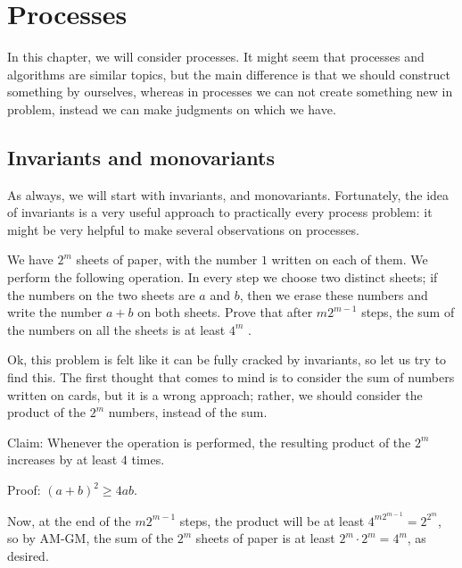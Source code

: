 \chapter{Processes}

In this chapter, we will consider processes. It might seem that processes and algorithms are similar topics, but the main difference is that we should construct something by ourselves, whereas in processes we can not create something new in problem, instead we can make judgments on which we have.

\section{Invariants and monovariants}

As always, we will start with invariants, and monovariants. Fortunately, the idea of invariants is a very useful approach to practically every process problem: it might be very helpful to make several observations on processes.

\begin{example}[ISL 2014]
    We have $2^m$ sheets of paper, with the number $1$ written on each of them. We perform the following operation. In every step we choose two distinct sheets; if the numbers on the two sheets are $a$ and $b$, then we erase these numbers and write the number $a + b$ on both sheets. Prove that after $m2^{m -1}$ steps, the sum of the numbers on all the sheets is at least $4^m$ .
\end{example}

\sol Ok, this problem is felt like it can be fully cracked by invariants, so let us try to find this. The first thought that comes to mind is to consider the sum of numbers written on cards, but it is a wrong approach; rather, we should consider the product of the $2^m$ numbers, instead of the sum.

Claim: Whenever the operation is performed, the resulting product of the $2^m$ increases by at least $4$ times.

Proof: $(a+b)^2 \geq 4ab$.

Now, at the end of the $m2^{m-1}$ steps, the product will be at least $4^{m2^{m-1}} = 2^{2^m}$, so by AM-GM, the sum of the $2^m$ sheets of paper is at least $2^m \cdot 2^m = 4^m$, as desired.

